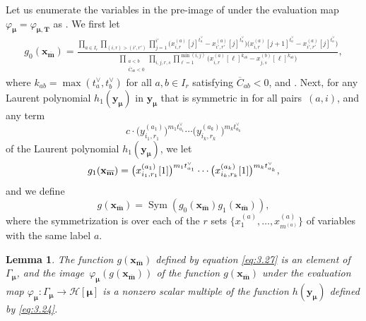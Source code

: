 \documentclass[pdftex]{sigma}
\numberwithin{equation}{section}
\newtheorem{Lemma}[Theorem]{Lemma}
\DeclareMathOperator{\Sym}{Sym}
\begin{document}
Let us enumerate the variables in the pre-image of  under the evaluation map $\varphi_{\bm{\mu}}= \varphi_{\bm{\mu},\mathbf{T}}$ as . We first let
\begin{gather}\label{eq:3.25}
g_0(\mathbf{x}_{\overline{\mathbf{m}}})
=\frac{\prod_{a\in I_r}\prod_{(i,r)>(i',r')} \prod_{j=1}^{i'}\bigl(x_{i,r}^{(a)}[j]^{t_a^{\vee}}-x_{i',r'}^{(a)}[j]^{t_a^{\vee}}\bigr)\!\bigl(x_{i,r}^{(a)}[j+1]^{t_a^{\vee}}-x_{i',r'}^{(a)}[j]^{t_a^{\vee}}\bigr)}{ \prod_{\substack{a<b\\\overline{C}_{ab}<0}}\prod_{i,j,r,s} \prod_{\ell=1}^{\min(i,j)}\bigl(x_{i,r}^{(a)}[\ell]^{k_{ab}}-x_{j,s}^{(b)}[\ell]^{k_{ab}}\bigr)},\!\!\!
\end{gather}
where $k_{ab}=\max(t_a^{\vee},t_b^{\vee})$ for all $a,b\in I_r$ satisfying $\overline{C}_{ab}<0$, and . Next, for any Laurent polynomial $h_1(\mathbf{y}_{\bm{\mu}})$ in $\mathbf{y}_{\bm{\mu}}$ that is symmetric in  for all pairs~$(a,i)$, and any term
\[
c\cdot \bigl(y_{i_1,r_1}^{(a_1)}\bigr)^{m_1t_{a_1}^{\vee}}\cdots\bigl(y_{i_k,r_k}^{(a_k)}\bigr)^{m_kt_{a_k}^{\vee}}
\] of the Laurent polynomial $h_1(\mathbf{y}_{\bm{\mu}})$, we let
\[
g_1(\mathbf{x}_{\overline{\mathbf{m}}})
=\smash{\bigl(x_{i_1,r_1}^{(a_1)}[1]\bigr)^{m_1t_{a_1}^{\vee}}\cdots \bigl(x_{i_k,r_k}^{(a_k)}[1]\bigr)^{m_kt_{a_k}^{\vee}}},
\]
and we define
\begin{equation}\label{eq:3.27}
g(\mathbf{x}_{\overline{\mathbf{m}}})
=\Sym(g_0(\mathbf{x}_{\overline{\mathbf{m}}})g_1(\mathbf{x}_{\overline{\mathbf{m}}})),
\end{equation}
where the symmetrization is over each of the $r$ sets $\bigl\{ x_1^{(a)},\dots,x_{m^{(a)}}^{(a)}\bigr\}$ of
variables with the same label $a$.

\begin{Lemma}\label{3.7}
The function $g(\mathbf{x}_{\overline{\mathbf{m}}})$ defined by equation \eqref{eq:3.27} is an element of $\Gamma_{\bm{\mu}}$, and the image~$\varphi_{\bm{\mu}}(g(\mathbf{x}_{\overline{ \mathbf{m}}}))$ of the function $g(\mathbf{x}_{\overline{ \mathbf{m}}})$ under the evaluation map $\varphi_{\bm{\mu}}\colon \Gamma_{\bm{\mu}}\to\mathcal{H}[\bm{\mu}]$ is a nonzero scalar multiple of the function $h(\mathbf{y}_{\bm{\mu}})$ defined by \eqref{eq:3.24}.
\end{Lemma}
\end{document}
